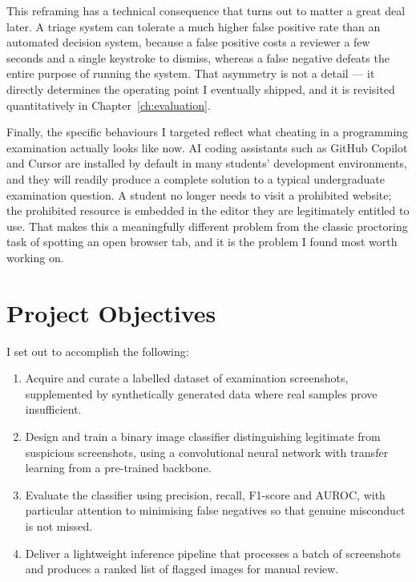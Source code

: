 \documentclass[12pt,oneside]{report}
\begin{document}
This reframing has a technical consequence that turns out to matter a great
deal later. A triage system can tolerate a much higher false positive rate than
an automated decision system, because a false positive costs a reviewer a few
seconds and a single keystroke to dismiss, whereas a false negative defeats the
entire purpose of running the system. That asymmetry is not a detail --- it
directly determines the operating point I eventually shipped, and it is
revisited quantitatively in Chapter~\ref{ch:evaluation}.

Finally, the specific behaviours I targeted reflect what cheating in a
programming examination actually looks like now. AI coding assistants such as
GitHub Copilot and Cursor are installed by default in many students'
development environments, and they will readily produce a complete solution to
a typical undergraduate examination question. A student no longer needs to
visit a prohibited website; the prohibited resource is embedded in the editor
they are legitimately entitled to use. That makes this a meaningfully different
problem from the classic proctoring task of spotting an open browser tab, and
it is the problem I found most worth working on.

\section{Project Objectives}
\label{sec:objectives}

I set out to accomplish the following:

\begin{enumerate}[itemsep=2pt]
  \item Acquire and curate a labelled dataset of examination screenshots,
        supplemented by synthetically generated data where real samples prove
        insufficient.
  \item Design and train a binary image classifier distinguishing legitimate
        from suspicious screenshots, using a convolutional neural network with
        transfer learning from a pre-trained backbone.
  \item Evaluate the classifier using precision, recall, F1-score and AUROC,
        with particular attention to minimising false negatives so that genuine
        misconduct is not missed.
  \item Deliver a lightweight inference pipeline that processes a batch of
        screenshots and produces a ranked list of flagged images for manual
        review.
\end{enumerate}
\end{document}

